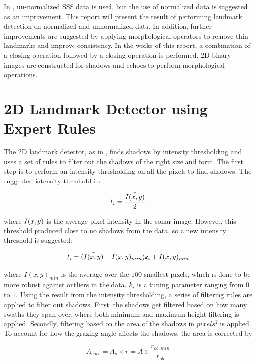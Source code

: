 In \cite{Al-Rawi2017LandmarkImages}, un-normalized SSS data is used, but the use of normalized data is suggested as an improvement. This report will present the result of performing landmark detection on normalized and unnormalized data. In addition, further improvements are suggested by applying morphological operators to remove thin landmarks and improve consistency. In the works of this report, a combination of a closing operation followed by a closing operation is performed. 2D binary images are constructed for shadows and echoes to perform morphological operations.  

\section{2D Landmark Detector using Expert Rules}

The 2D landmark detector, as in \cite{Leblond2019SonarProject}, finds shadows by intensity thresholding and uses a set of rules to filter out the shadows of the right size and form. The first step is to perform an intensity thresholding on all the pixels to find shadows. The suggested intensity threshold is:

\begin{equation}
    t_i = \frac{\Bar{I(x,y)}}{2}
    \label{eq:orginal_int_thres}
\end{equation}

where $\Bar{I(x,y)}$ is the average pixel intensity in the sonar image. However, this threshold produced close to no shadows from the data, so a new intensity threshold is suggested:

\begin{equation}
    t_i = (\Bar{I(x,y)} - I(x,y)_{min}) k_i + I(x,y)_{min} 
\end{equation}

where $I(x,y)_{min}$ is the average over the $100$ smallest pixels, which is done to be more robust against outliers in the data. $k_i$ is a tuning parameter ranging from $0$ to $1$. Using the result from the intensity thresholding, a series of filtering rules are applied to filter out shadows. First, the shadows get filtered based on how many swaths they span over, where both minimum and maximum height filtering is applied. Secondly, filtering based on the area of the shadows in $pixels^2$ is applied. To account for how the grazing angle affects the shadows, the area is corrected by

\begin{equation}
    A_{corr} = A_s \times r = A \times \frac{r_{ob,min}}{r_{ob}}
    \label{eq:corrected_area}
\end{equation}

